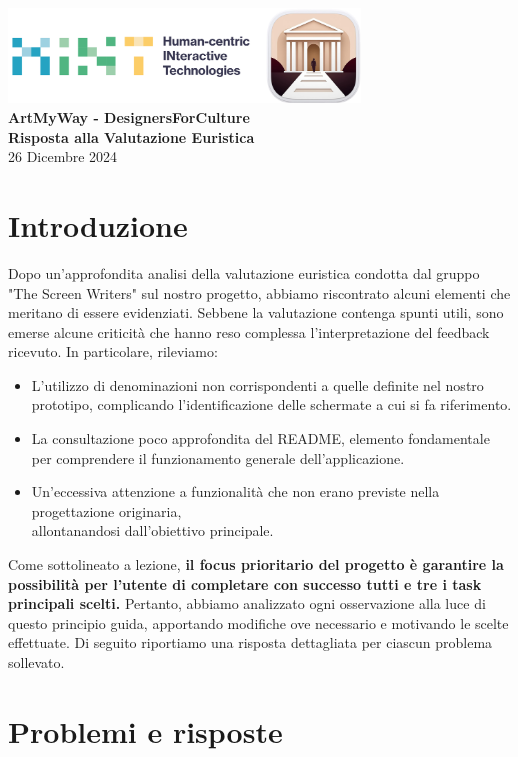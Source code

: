 \documentclass{article}
\begin{document}
\begin{center}
    \includegraphics[width=0.7\textwidth]{../assets/HINT+Logo.png} \\[1em]
    {\LARGE \textbf{ArtMyWay - DesignersForCulture}} \\[0.5em]
    {\Large \textbf{Risposta alla Valutazione Euristica}} \\[1.5em]
    {\large 26 Dicembre 2024}
\end{center}

\section*{Introduzione}

Dopo un'approfondita analisi della valutazione euristica condotta dal gruppo "The Screen Writers" sul nostro progetto, abbiamo riscontrato alcuni elementi che meritano di essere evidenziati. Sebbene la valutazione contenga spunti utili, sono emerse alcune criticità che hanno reso complessa l’interpretazione del feedback ricevuto. In particolare, rileviamo:
\begin{itemize}
    \item L’utilizzo di denominazioni non corrispondenti a quelle definite nel nostro prototipo, complicando l'identificazione delle schermate a cui si fa riferimento.
    \item La consultazione poco approfondita del README, elemento fondamentale per comprendere il funzionamento generale dell’applicazione.
    \item Un'eccessiva attenzione a funzionalità che non erano previste nella progettazione originaria, \\ allontanandosi dall’obiettivo principale.
\end{itemize}
Come sottolineato a lezione, \textbf{il focus prioritario del progetto è garantire la possibilità per l’utente di completare con successo tutti e tre i task principali scelti.} Pertanto, abbiamo analizzato ogni osservazione alla luce di questo principio guida, apportando modifiche ove necessario e motivando le scelte effettuate. Di seguito riportiamo una risposta dettagliata per ciascun problema sollevato.

\section*{Problemi e risposte}
\end{document}
